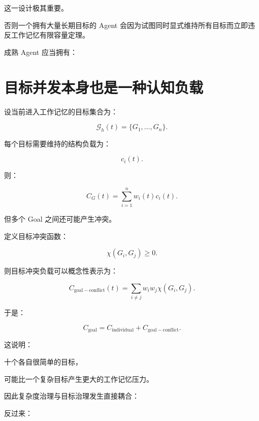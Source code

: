 这一设计极其重要。

否则一个拥有大量长期目标的 Agent 会因为试图同时显式维持所有目标而立即违反工作记忆有限容量定理。

成熟 Agent 应当拥有：

\begin{statementbox}
\centering
{}
\end{statementbox}


\section{目标并发本身也是一种认知负载}

设当前进入工作记忆的目标集合为：

\[
\mathcal G_h(t)
=
\{G_1,\dots,G_n\}.
\]

每个目标需要维持的结构负载为：

\[
c_i(t).
\]

则：

\[
C_G(t)
=
\sum_{i=1}^{n}
w_i(t)c_i(t).
\]

但多个 Goal 之间还可能产生冲突。

定义目标冲突函数：

\[
\chi(G_i,G_j)
\geq0.
\]

则目标冲突负载可以概念性表示为：

\[
C_{\mathrm{goal-conflict}}(t)
=
\sum_{i\neq j}
w_iw_j
\chi(G_i,G_j).
\]

于是：

\[
\boxed{
C_{\mathrm{goal}}
=
C_{\mathrm{individual}}
+
C_{\mathrm{goal-conflict}}.
}
\]

这说明：

十个各自很简单的目标，

可能比一个复杂目标产生更大的工作记忆压力。

因此复杂度治理与目标治理发生直接耦合：

\begin{statementbox}
\centering
{}
\end{statementbox}

反过来：

\begin{statementbox}
\centering
{}
\end{statementbox}

